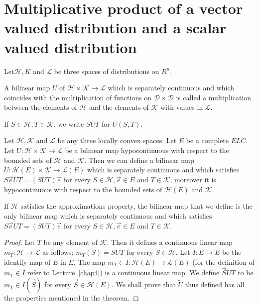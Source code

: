 \chapter[Multiplicative product of a vector...]{Multiplicative product of a vector valued distribution and 
a scalar valued distribution}\label{chap7}

Let\pageoriginale $\mathscr{H}, K$ and $\mathscr{L}$ be three spaces
of distributions on $R^n$.

\setcounter{section}{7}
\setcounter{definition}{0}
\begin{definition}\label{chap7:def7.1}
A bilinear map $U$ of $\mathscr{H} \times \mathscr{K} \to \mathscr{L}$
which is separately continuous and which coincides with the
multiplication of functions on $\mathscr{D} \times \mathscr{D}$ is
called a multiplication between the elements of $\mathscr{H}$ and the
elements of $\mathscr{K}$ with values in $\mathscr{L}$. 

If $S\in\mathscr{H}, T\in\mathscr{K}$, we write $S U T$ for $U(S, T)$.
\end{definition}

\setcounter{section}{7}
\setcounter{theorem}{0}
\begin{theorem}\label{chap7:thm7.1}
Let $\mathscr{H}, \mathscr{K}$ and $\mathscr{L}$ be any three locally
convex spaces. Let $E$ be a complete $E L C$. Let $U : \mathscr{H}
\times \mathscr{K} \to \mathscr{L}$ be a bilinear map hypocontinuous
with respect to the bounded sets of $\mathscr{H}$ and
$\mathscr{K}$. Then we can define a bilinear map $\tilde{U}:
\mathscr{H}(E) \times \mathscr{K} \to \mathscr{L}(E)$ which is
separately continuous and which satisfies $S \overrightarrow{e}
\tilde{U} T = (S U T) \overrightarrow{e}$ for every $S \in
\mathscr{H}, \overrightarrow{e} \in E$ and $T \in \mathscr{K}$;
moreover it is hypocontinuous with respect to the bounded sets of
$\mathscr{H}(E)$ and $\mathscr{K}$.

If $\mathscr{H}$ satisfies the approximations property, the bilinear
map that we define is the only bilinear map which is separately
continuous and which satisfies $S \overrightarrow{e} \tilde{U} T = 
(S U T) \overrightarrow{e}$ for every $S \in \mathscr{H},
\overrightarrow{e} \in E$ and $T\in\mathscr{K}$.
\end{theorem}

\begin{proof}
Let $T$ be any element of $\mathscr{K}$. Then it defines a continuous
linear map $m_T : \mathscr{H}\to\mathscr{L}$ as follows: $m_T(S) = S
U T$ for every $S \in \mathscr{H}$. Let $I : E \to E$ be the
identify map of $E$ in $E$. The map $m_T \in I :
\mathscr{H}(E) \to \mathscr{L}(E)$ (for the definition of $m_T
\in I$ refer to Lecture~\ref{chap4}) is a continuous linear map. We
define $\overrightarrow{S} \tilde{U} T$ to be $m_T \in I
(\overrightarrow{S})$ for every $\overrightarrow{S} \in
\mathscr{H}(E)$. We shall prove that $\tilde{U}$ thus defined has all
the properties mentioned in the theorem.
\end{proof}

